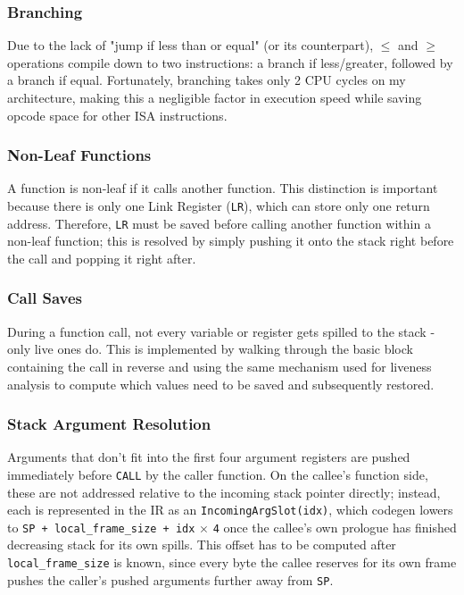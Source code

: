 \documentclass{article}
\begin{document}
\subsubsection{Branching}
Due to the lack of "jump if less than or equal" (or its counterpart), $\le$ and $\ge$ operations compile down to two instructions: a branch if less/greater, followed by a branch if equal. Fortunately, branching takes only 2 CPU cycles on my architecture, making this a negligible factor in execution speed while saving opcode space for other ISA instructions. 

\subsubsection{Non-Leaf Functions}
A function is non-leaf if it calls another function. This distinction is important because there is only one Link Register (\texttt{LR}), which can store only one return address. Therefore, \texttt{LR} must be saved before calling another function within a non-leaf function; this is resolved by simply pushing it onto the stack right before the call and popping it right after.

\subsubsection{Call Saves}
During a function call, not every variable or register gets spilled to the stack - only live ones do. This is implemented by walking through the basic block containing the call in reverse and using the same mechanism used for liveness analysis to compute which values need to be saved and subsequently restored.

\subsubsection{Stack Argument Resolution}
Arguments that don't fit into the first four argument registers are pushed immediately before \texttt{CALL} by the caller function. On the callee's function side, these are not addressed relative to the incoming stack pointer directly; instead, each is represented in the IR as an \texttt{IncomingArgSlot(idx)}, which codegen lowers to \texttt{SP + local\_frame\_size + idx} $\times$ \texttt{4} once the callee's own prologue has finished decreasing stack for its own spills. This offset has to be computed after \texttt{local\_frame\_size} is known, since every byte the callee reserves for its own frame pushes the caller's pushed arguments further away from \texttt{SP}.
\end{document}
